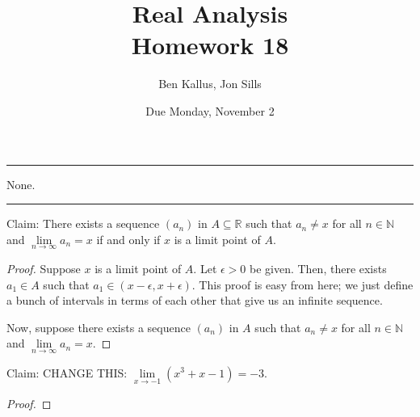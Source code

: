 \documentclass[12pt]{article}
\title{Real Analysis \\ Homework 18}
\author{Ben Kallus, Jon Sills}
\date{Due Monday, November 2}
\begin{document}
\pagecolor{black}
\color{white}
\maketitle

\hrule
\bigskip

 None.

\bigskip
\hrule
\bigskip

 Claim: There exists a sequence $(a_n)$ in $A \subseteq \mathbb R$ such that $a_n \neq x$ for all $n \in \mathbb N$ and $\lim\limits_{n\to\infty}a_n=x$ if and only if $x$ is a limit point of $A$.
\begin{proof}
    Suppose $x$ is a limit point of $A$. Let $\epsilon > 0$ be given. Then, there exists $a_1 \in A$ such that $a_1 \in (x-\epsilon, x+\epsilon)$. This proof is easy from here; we just define a bunch of intervals in terms of each other that give us an infinite sequence.

    Now, suppose there exists a sequence $(a_n)$ in $A$ such that $a_n \neq x$ for all $n \in \mathbb N$ and $\lim\limits_{n\to\infty}a_n=x$.
\end{proof}


\newpage
{} Claim: CHANGE THIS: $\lim\limits_{x\to-1}(x^3+x-1)=-3$.
\begin{proof}
    
\end{proof}
\end{document}

